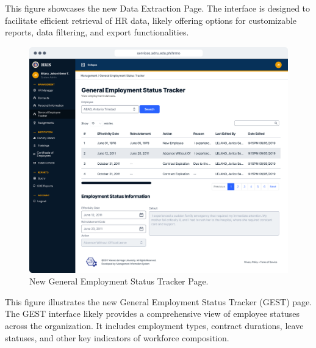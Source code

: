     This figure showcases the new Data Extraction Page. The interface is designed to facilitate efficient retrieval of HR data, likely offering options for customizable reports, data filtering, and export functionalities.

    \begin{figure}[H]
        \centering
        \includegraphics[width=1\linewidth]{figures/app/gest.png}
        \caption{New General Employment Status Tracker Page.}
        \label{fig:app-gest}
    \end{figure}

    This figure illustrates the new General Employment Status Tracker (GEST) page. The GEST interface likely provides a comprehensive view of employee statuses across the organization. It includes employment types, contract durations, leave statuses, and other key indicators of workforce composition. 

